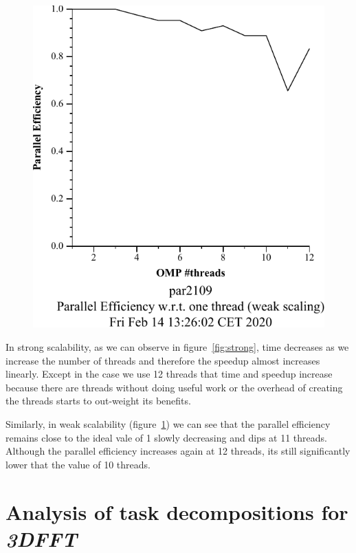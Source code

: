 \begin{figure}[H]
\begin{minipage}{.5\textwidth}
  \includegraphics[width=.7\linewidth]{./data/pi/pi_omp-100000000-1-12-3-weak-boada-3.pdf}
  \label{fig:weak}
\end{minipage}
\end{figure}

In strong scalability, as we can observe in figure~\ref{fig:strong}, time decreases as we increase the number of threads and therefore the speedup almost increases linearly. Except in the case we use 12 threads that time and speedup increase because there are threads without doing useful work or the overhead of creating the threads starts to out-weight its benefits.


Similarly, in weak scalability (figure~\ref{fig:weak}) we can see that the parallel efficiency remains close to the ideal vale of 1 slowly decreasing and dips at 11 threads. Although the parallel efficiency increases again at 12 threads,
its still significantly lower that the value of 10 threads.


\section{Analysis of task decompositions for \emph{3DFFT}}%
\label{sec:analysis_of_task_decompositions_for_3dfft}



